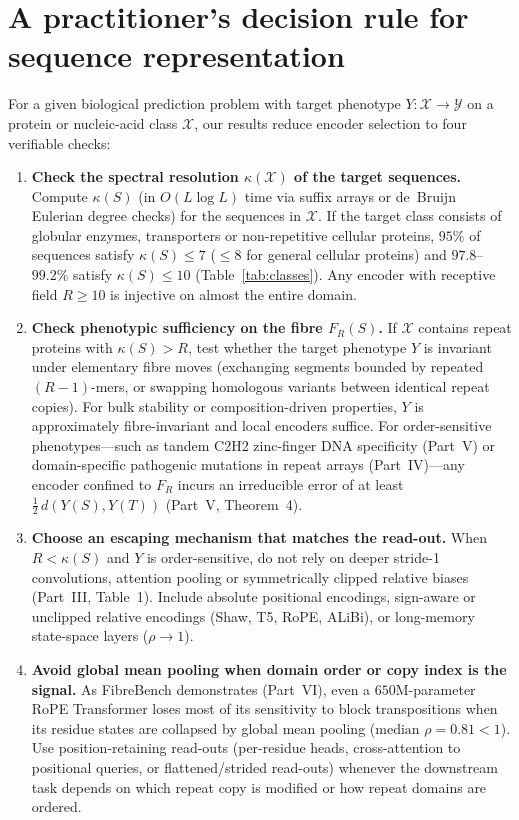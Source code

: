 \documentclass[11pt]{article}
\theoremstyle{plain}
\theoremstyle{definition}
\theoremstyle{remark}
\begin{document}
\section{A practitioner's decision rule for sequence representation}\label{sec:guide}

For a given biological prediction problem with target phenotype $Y\colon\mathcal X\to\mathcal Y$ on a protein or
nucleic-acid class $\mathcal X$, our results reduce encoder selection to four verifiable checks:

\begin{enumerate}
\item \textbf{Check the spectral resolution $\kappa(\mathcal X)$ of the target sequences.}
Compute $\kappa(S)$ (in $O(L\log L)$ time via suffix arrays or de~Bruijn Eulerian degree checks) for the sequences
in $\mathcal X$. If the target class consists of globular enzymes, transporters or non-repetitive cellular proteins,
$95\%$ of sequences satisfy $\kappa(S)\le7$ ($\le8$ for general cellular proteins) and $97.8$--$99.2\%$ satisfy
$\kappa(S)\le10$ (Table~\ref{tab:classes}). Any
encoder with receptive field $R\ge10$ is injective on almost the entire domain.
\item \textbf{Check phenotypic sufficiency on the fibre $F_R(S)$.}
If $\mathcal X$ contains repeat proteins with $\kappa(S)>R$, test whether the target phenotype $Y$ is invariant
under elementary fibre moves (exchanging segments bounded by repeated $(R-1)$-mers, or swapping homologous variants
between identical repeat copies). For bulk stability or composition-driven properties, $Y$ is approximately
fibre-invariant and local encoders suffice. For order-sensitive phenotypes—such as tandem C2H2 zinc-finger DNA
specificity (Part~V) or domain-specific pathogenic mutations in repeat arrays (Part~IV)—any encoder confined to
$F_R$ incurs an irreducible error of at least $\frac12\,d(Y(S),Y(T))$ (Part~V, Theorem~4).
\item \textbf{Choose an escaping mechanism that matches the read-out.}
When $R<\kappa(S)$ and $Y$ is order-sensitive, do not rely on deeper stride-1 convolutions, attention pooling or
symmetrically clipped relative biases (Part~III, Table~1). Include absolute positional encodings, sign-aware
or unclipped relative encodings (Shaw, T5, RoPE, ALiBi), or long-memory state-space layers ($\rho\to1$).
\item \textbf{Avoid global mean pooling when domain order or copy index is the signal.}
As FibreBench demonstrates (Part~VI), even a $650$M-parameter RoPE Transformer loses most of its sensitivity to
block transpositions when its residue states are collapsed by global mean pooling ($\text{median }\rho=0.81<1$).
Use position-retaining read-outs (per-residue heads, cross-attention to positional queries, or flattened/strided
read-outs) whenever the downstream task depends on which repeat copy is modified or how repeat domains are ordered.
\end{enumerate}
\end{document}
